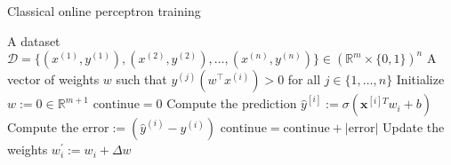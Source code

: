 \documentclass{article}
\begin{document}
\pagestyle{empty}
\begin{algorithm}[ht]
	\caption{Classical online perceptron training} 	
	\begin{algorithmic}[1]
    \Require A dataset $\mathcal{D}=\{ (x^{(1)},y^{(1)}), (x^{(2)}, y^{(2)} ) ,\ldots, ( x^{(n)},y^{(n)})\} \in (\mathbb{R}^{m} \times\{0,1\})^{n}$
    \Ensure A vector of weights $w$ such that $y^{(j)}(w^\top x^{(i)}) > 0$ for all $j \in \{1, \dots, n\}$
		\State Initialize ${w}:={0} \in \mathbb{R}^{m+1}$
		\State $\mathrm{continue}=0$
		  \Do
				\State Compute the prediction $\hat{y}^{[i]}:=\sigma\left(\mathbf{x}^{[i]T} {w}_{i}+b\right)$
        		\State Compute the $\mathrm{error}:=\left(\hat{y}^{(i)}-{y}^{(i)}\right)$
        		\State $\mathrm{continue} = \mathrm{continue} + |\mathrm{error}|$
        		\State Update the weights ${w}_{i}^{'}:={w}_{i}+\Delta{w}$
        \EndFor
        
	\end{algorithmic}
\end{algorithm}
\end{document}
